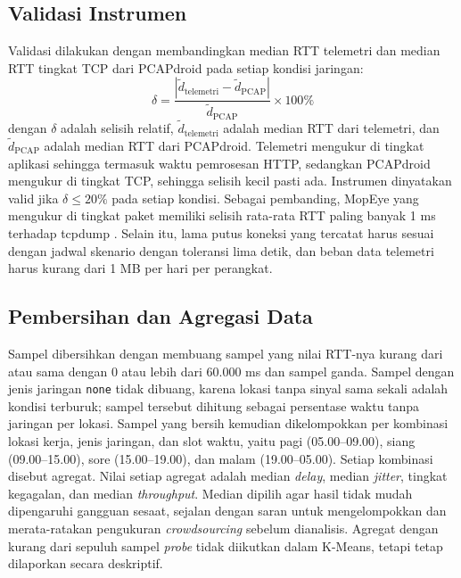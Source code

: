 \subsection{Validasi Instrumen}
Validasi dilakukan dengan membandingkan median RTT telemetri dan median RTT tingkat TCP dari PCAPdroid pada setiap kondisi jaringan:
\begin{equation}
\delta = \frac{\left| \tilde{d}_{\mathrm{telemetri}} - \tilde{d}_{\mathrm{PCAP}} \right|}{\tilde{d}_{\mathrm{PCAP}}} \times 100\%
\label{eq:validasi}
\end{equation}
dengan $\delta$ adalah selisih relatif, $\tilde{d}_{\mathrm{telemetri}}$ adalah median RTT dari telemetri, dan $\tilde{d}_{\mathrm{PCAP}}$ adalah median RTT dari PCAPdroid. Telemetri mengukur di tingkat aplikasi sehingga termasuk waktu pemrosesan HTTP, sedangkan PCAPdroid mengukur di tingkat TCP, sehingga selisih kecil pasti ada. Instrumen dinyatakan valid jika $\delta \le 20\%$ pada setiap kondisi. Sebagai pembanding, MopEye yang mengukur di tingkat paket memiliki selisih rata-rata RTT paling banyak 1 ms terhadap tcpdump \parencite{wu2017mopeye}. Selain itu, lama putus koneksi yang tercatat harus sesuai dengan jadwal skenario dengan toleransi lima detik, dan beban data telemetri harus kurang dari 1 MB per hari per perangkat.

\subsection{Pembersihan dan Agregasi Data}
Sampel dibersihkan dengan membuang sampel yang nilai RTT-nya kurang dari atau sama dengan 0 atau lebih dari 60.000 ms dan sampel ganda. Sampel dengan jenis jaringan \texttt{none} tidak dibuang, karena lokasi tanpa sinyal sama sekali adalah kondisi terburuk; sampel tersebut dihitung sebagai persentase waktu tanpa jaringan per lokasi. Sampel yang bersih kemudian dikelompokkan per kombinasi lokasi kerja, jenis jaringan, dan slot waktu, yaitu pagi (05.00--09.00), siang (09.00--15.00), sore (15.00--19.00), dan malam (19.00--05.00). Setiap kombinasi disebut agregat. Nilai setiap agregat adalah median \textit{delay}, median \textit{jitter}, tingkat kegagalan, dan median \textit{throughput}. Median dipilih agar hasil tidak mudah dipengaruhi gangguan sesaat, sejalan dengan saran \textcite{tripkovic2021cluster} untuk mengelompokkan dan merata-ratakan pengukuran \textit{crowdsourcing} sebelum dianalisis. Agregat dengan kurang dari sepuluh sampel \textit{probe} tidak diikutkan dalam K-Means, tetapi tetap dilaporkan secara deskriptif.

